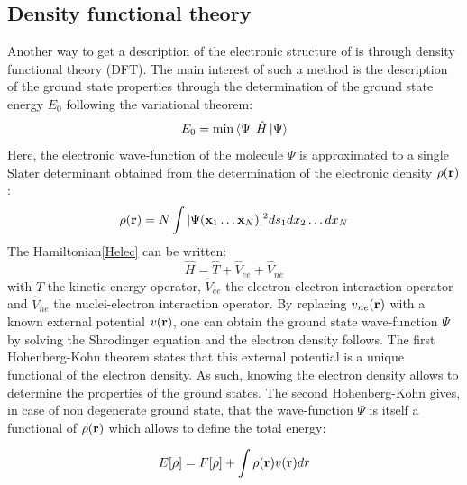 \documentclass[12pt]{report}
\numberwithin{equation}{section}
\begin{document}
\subsection{Density functional theory}

Another way to get a description of the electronic structure of is through density functional theory (DFT).
The main interest of such a method is the description of the ground state properties through the determination of the ground state energy $E_0$ following the variational theorem:
\begin{equation}
    E_0 = \min \bra{\Psi} \hat{H} \ket{\Psi}
\end{equation}
Here, the electronic wave-function of the molecule $\Psi$ is approximated to a single Slater determinant obtained from the determination of the electronic density $\rho(\vb r)$:
\begin{equation}
    \rho(\vb r)=N\int |\Psi(\vb x_1 \ldots \vb x_N)|^2 ds_1 dx_2 \ldots dx_N
\end{equation}
The Hamiltonian\ref{Helec} can be written:
\begin{equation}\label{Hop}
    \hat{H}=\hat{T} + \hat{V}_{ee} + \hat{V}_{ne}
\end{equation} 
with $\hat{T}$ the kinetic energy operator, $\hat{V}_{ee}$ the electron-electron interaction operator and $\hat{V}_{ne}$ the nuclei-electron interaction operator. 
By replacing $v_{ne}(\vb r)$ with a known external potential $v(\vb r)$, one can obtain the ground state wave-function $\Psi$ by solving the Shrodinger equation and the electron density follows.
The first Hohenberg-Kohn theorem states that this external potential is a unique functional of the electron density.
As such, knowing the electron density allows to determine the properties of the ground states.
The second Hohenberg-Kohn gives, in case of non degenerate ground state, that the wave-function $\Psi$ is itself a functional of $\rho(\vb r)$ which allows to define the total energy:

\begin{equation}\label{EnergyDFT}
    E[\rho]= F[\rho]+ \int \rho(\vb r) v(\vb r)dr
\end{equation}
\end{document}
